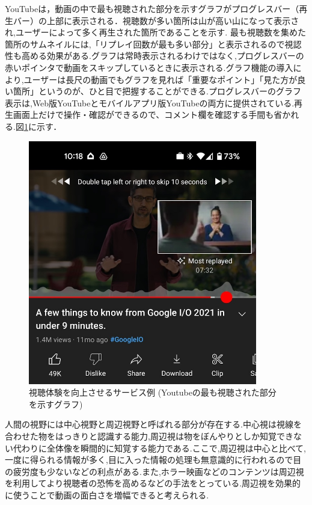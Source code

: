 YouTubeは，動画の中で最も視聴された部分を示すグラフがプログレスバー（再生バー）の上部に表示される．視聴数が多い箇所は山が高い山になって表示され,ユーザーによって多く再生された箇所であることを示す.
最も視聴数を集めた箇所のサムネイルには,「リプレイ回数が最も多い部分」と表示されるので視認性も高める効果がある.グラフは常時表示されるわけではなく,プログレスバーの赤いポインタで動画をスキップしているときに表示される.グラフ機能の導入により,ユーザーは長尺の動画でもグラフを見れば「重要なポイント」「見た方が良い箇所」というのが、ひと目で把握することができる.プログレスバーのグラフ表示は,Web版YouTubeとモバイルアプリ版YouTubeの両方に提供されている.再生画面上だけで操作・確認ができるので、コメント欄を確認する手間も省かれる.図\ref{youtube}に示す．
\begin{figure}[H]
    \centering
    \includegraphics[width=10cm]{images/chapter1/YouTube.jpeg}
    \caption{視聴体験を向上させるサービス例 (Youtubeの最も視聴された部分を示すグラフ)}
    \label{youtube}
\end{figure}

人間の視野には中心視野と周辺視野と呼ばれる部分が存在する.中心視は視線を合わせた物をはっきりと認識する能力,周辺視は物をぼんやりとしか知覚できない代わりに全体像を瞬間的に知覚する能力である.ここで,周辺視は中心と比べて,一度に得られる情報が多く,目に入った情報の処理も無意識的に行われるので目の疲労度も少ないなどの利点がある.また,ホラー映画などのコンテンツは周辺視を利用してより視聴者の恐怖を高めるなどの手法をとっている.周辺視を効果的に使うことで動画の面白さを増幅できると考えられる.

